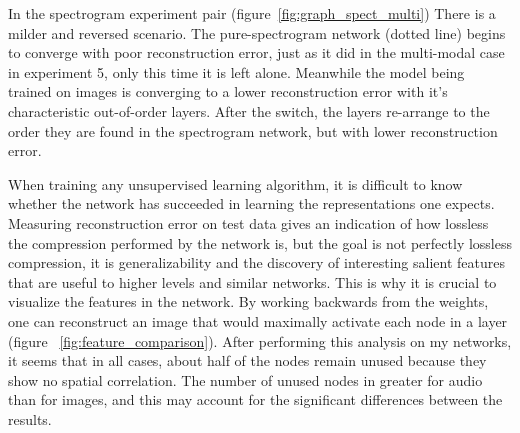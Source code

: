 \documentclass[12pt]{article}
\begin{document}
\begin{doublespacing}
	In the spectrogram experiment pair (figure~\ref{fig:graph_spect_multi}) There is a milder and reversed scenario. The pure-spectrogram network (dotted line) begins to converge with poor reconstruction error, just as it did in the multi-modal case in experiment 5, only this time it is left alone. Meanwhile the model being trained on images is converging to a lower reconstruction error with it's characteristic out-of-order layers. After the switch, the layers re-arrange to the order they are found in the spectrogram network, but with lower reconstruction error.
	
	When training any unsupervised learning algorithm, it is difficult to know whether the network has succeeded in learning the representations one expects. Measuring reconstruction error on test data gives an indication of how lossless the compression performed by the network is, but the goal is not perfectly lossless compression, it is generalizability and the discovery of interesting salient features that are useful to higher levels and similar networks. This is why it is crucial to visualize the features in the network. By working backwards from the weights, one can reconstruct an image that would maximally activate each node in a layer (figure ~\ref{fig:feature_comparison}). After performing this analysis on my networks, it seems that in all cases, about half of the nodes remain unused because they show no spatial correlation. The number of unused nodes in greater for audio than for images, and this may account for the significant differences between the results.


\end{doublespacing}
\end{document}
